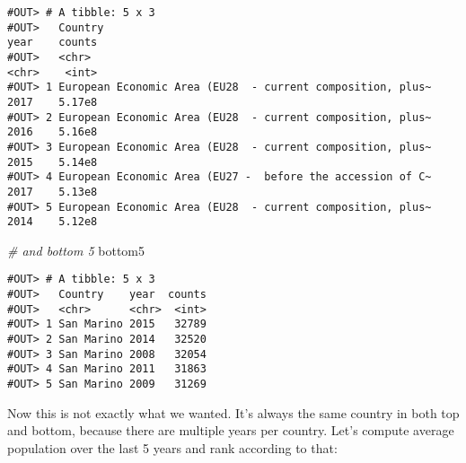 \documentclass[]{book}
\newenvironment{Shaded}{\begin{snugshade}}{\end{snugshade}}
\newcommand{\KeywordTok}[1]{\textcolor[rgb]{0.13,0.29,0.53}{\textbf{#1}}}
\newcommand{\DataTypeTok}[1]{\textcolor[rgb]{0.13,0.29,0.53}{#1}}
\newcommand{\DecValTok}[1]{\textcolor[rgb]{0.00,0.00,0.81}{#1}}
\newcommand{\StringTok}[1]{\textcolor[rgb]{0.31,0.60,0.02}{#1}}
\newcommand{\CommentTok}[1]{\textcolor[rgb]{0.56,0.35,0.01}{\textit{#1}}}
\newcommand{\OperatorTok}[1]{\textcolor[rgb]{0.81,0.36,0.00}{\textbf{#1}}}
\newcommand{\NormalTok}[1]{#1}
\begin{document}
\begin{verbatim}
#OUT> # A tibble: 5 x 3
#OUT>   Country                                                    year    counts
#OUT>   <chr>                                                      <chr>    <int>
#OUT> 1 European Economic Area (EU28  - current composition, plus~ 2017    5.17e8
#OUT> 2 European Economic Area (EU28  - current composition, plus~ 2016    5.16e8
#OUT> 3 European Economic Area (EU28  - current composition, plus~ 2015    5.14e8
#OUT> 4 European Economic Area (EU27 -  before the accession of C~ 2017    5.13e8
#OUT> 5 European Economic Area (EU28  - current composition, plus~ 2014    5.12e8
\end{verbatim}

\begin{Shaded}
\begin{Highlighting}[]
\CommentTok{# and bottom 5}
\NormalTok{bottom5}
\end{Highlighting}
\end{Shaded}

\begin{verbatim}
#OUT> # A tibble: 5 x 3
#OUT>   Country    year  counts
#OUT>   <chr>      <chr>  <int>
#OUT> 1 San Marino 2015   32789
#OUT> 2 San Marino 2014   32520
#OUT> 3 San Marino 2008   32054
#OUT> 4 San Marino 2011   31863
#OUT> 5 San Marino 2009   31269
\end{verbatim}

Now this is not exactly what we wanted. It's always the same country in
both top and bottom, because there are multiple years per country. Let's
compute average population over the last 5 years and rank according to
that:

\begin{Shaded}
\end{Shaded}
\end{document}
